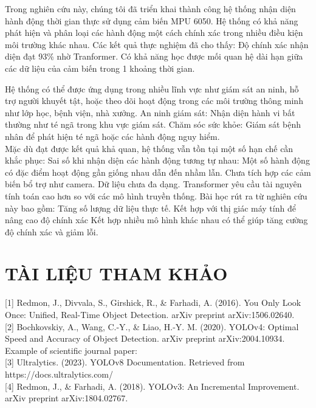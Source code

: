\documentclass[journal]{IEEEtran}
\begin{document}
Trong nghiên cứu này, chúng tôi đã triển khai thành công hệ thống nhận diện hành động thời gian thực sử dụng cảm biến MPU 6050. Hệ thống có khả năng phát hiện và phân loại các hành động một cách chính xác trong nhiều điều kiện môi trường khác nhau. Các kết quả thực nghiệm đã cho thấy:
Độ chính xác nhận diện đạt 93\% nhờ Tranformer. Có khả năng học được mối quan hệ dài hạn giữa các dữ liệu của cảm biến trong 1 khoảng thời gian.

Hệ thống có thể được ứng dụng trong nhiều lĩnh vực như giám sát an ninh, hỗ trợ người khuyết tật, hoặc theo dõi hoạt động trong các môi trường thông minh như lớp học, bệnh viện, nhà xưởng.
An ninh giám sát: Nhận diện hành vi bất thường như té ngã trong khu vực giám sát.
Chăm sóc sức khỏe: Giám sát bệnh nhân để phát hiện té ngã hoặc các hành động nguy hiểm.\\


Mặc dù đạt được kết quả khả quan, hệ thống vẫn tồn tại một số hạn chế cần khắc phục:
Sai số khi nhận diện các hành động tương tự nhau: Một số hành động có đặc điểm hoạt động gần giống nhau dẫn đến nhầm lẫn.
Chưa tích hợp các cảm biến bổ trợ như camera.
Dữ liệu chưa đa dạng.
Transformer yêu cầu tài nguyên tính toán cao hơn so với các mô hình truyền thống.
Bài học rút ra từ nghiên cứu này bao gồm:
Tăng số lượng dữ liệu thực tế.
Kết hợp với thị giác máy tính để nâng cao độ chính xác
Kết hợp nhiều mô hình khác nhau có thể giúp tăng cường độ chính xác và giảm lỗi.\\

\section*{\centering TÀI LIỆU THAM KHẢO}

[1] Redmon, J., Divvala, S., Girshick, R., \& Farhadi, A. (2016). You Only Look Once: Unified, Real-Time Object Detection. arXiv preprint arXiv:1506.02640.\\

[2] Bochkovskiy, A., Wang, C.-Y., \& Liao, H.-Y. M. (2020). YOLOv4: Optimal Speed and Accuracy of Object Detection. arXiv preprint arXiv:2004.10934.\\
Example of scientific journal paper:\\

[3] Ultralytics. (2023). YOLOv8 Documentation. Retrieved from https://docs.ultralytics.com/\\

[4] Redmon, J., \& Farhadi, A. (2018). YOLOv3: An Incremental Improvement. arXiv preprint arXiv:1804.02767.\\
\end{document}
